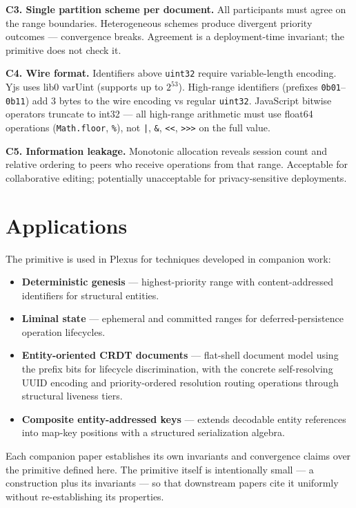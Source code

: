 \textbf{C3. Single partition scheme per document.} All participants must agree on the range boundaries. Heterogeneous schemes produce divergent priority outcomes --- convergence breaks. Agreement is a deployment-time invariant; the primitive does not check it.

\textbf{C4. Wire format.} Identifiers above \texttt{uint32} require variable-length encoding. Yjs uses lib0 varUint (supports up to $2^{53}$). High-range identifiers (prefixes \texttt{0b01}--\texttt{0b11}) add 3 bytes to the wire encoding vs regular \texttt{uint32}. JavaScript bitwise operators truncate to int32 --- all high-range arithmetic must use float64 operations (\texttt{Math.floor}, \texttt{\%}), not \texttt{|}, \texttt{\&}, \texttt{<<}, \texttt{>>>} on the full value.

\textbf{C5. Information leakage.} Monotonic allocation reveals session count and relative ordering to peers who receive operations from that range. Acceptable for collaborative editing; potentially unacceptable for privacy-sensitive deployments.

\section{Applications}

The primitive is used in Plexus for techniques developed in companion work:

\begin{itemize}
    \item \textbf{Deterministic genesis}\cite{plexus:genesis} --- highest-priority range with content-addressed identifiers for structural entities.
    \item \textbf{Liminal state}\cite{plexus:liminal} --- ephemeral and committed ranges for deferred-persistence operation lifecycles.
    \item \textbf{Entity-oriented CRDT documents}\cite{plexus:arch} --- flat-shell document model using the prefix bits for lifecycle discrimination, with the concrete self-resolving UUID encoding and priority-ordered resolution routing operations through structural liveness tiers.
    \item \textbf{Composite entity-addressed keys}\cite{plexus:keys} --- extends decodable entity references into map-key positions with a structured serialization algebra.
\end{itemize}

Each companion paper establishes its own invariants and convergence claims over the primitive defined here. The primitive itself is intentionally small --- a construction plus its invariants --- so that downstream papers cite it uniformly without re-establishing its properties.

